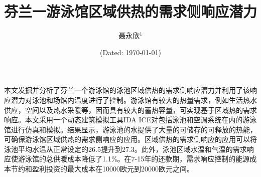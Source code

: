 \documentclass[hyperref]{ctexart}
\title{\textbf{芬兰一游泳馆区域供热的需求侧响应潜力}}
\author{\sffamily 聂永欣$^1$}
\date{(Dated: \today)}
\begin{document}
	\maketitle
	本文发掘并分析了芬兰一个游泳馆的泳池区域供热的需求侧响应潜力并利用了该响应潜力对泳池和场馆内温度进行了控制。游泳馆有较大的热量需求，例如生活热水供应，空间以及热水采暖等，因而具有较大的蓄热容量，可实现基于区域热的需求响应。本文采用一个动态建筑模拟工具IDA ICE对包括泳池和空调系统在内的游泳馆进行仿真和模拟。结果显示，游泳池的水提供了大量的可储存的可释放的热能，可确保游泳馆区域供热的需求侧响应的应用。区域供热的需求侧响应的应用可以将泳池平均水温从正常设定的26.5\textcelsius 提升到27.3\textcelsius。此外，泳池区域水温和气温的需求响应使游泳馆的总供暖成本降低了1.1\%。在7-15年的还款期，需求响应控制的能源成本节约和盈利投资的最大成本在10000欧元到20000欧元之间。
	\par
\end{document}
